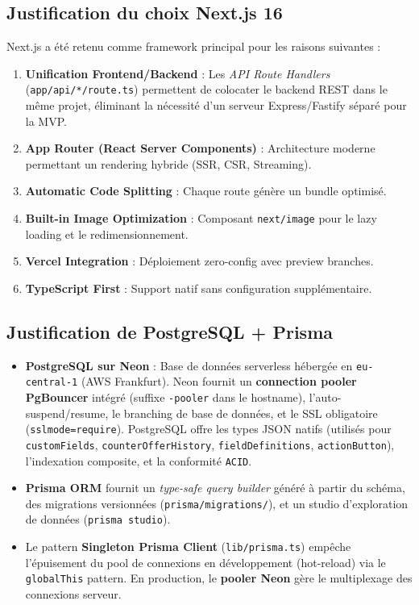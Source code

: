 \documentclass[12pt, a4paper]{article}
\begin{document}
\subsection{Justification du choix Next.js 16}

Next.js a été retenu comme framework principal pour les raisons suivantes :

\begin{enumerate}[leftmargin=2em]
  \item \textbf{Unification Frontend/Backend} : Les \textit{API Route Handlers} (\texttt{app/api/*/route.ts}) permettent de colocater le backend REST dans le même projet, éliminant la nécessité d'un serveur Express/Fastify séparé pour la MVP.
  \item \textbf{App Router (React Server Components)} : Architecture moderne permettant un rendering hybride (SSR, CSR, Streaming).
  \item \textbf{Automatic Code Splitting} : Chaque route génère un bundle optimisé.
  \item \textbf{Built-in Image Optimization} : Composant \texttt{next/image} pour le lazy loading et le redimensionnement.
  \item \textbf{Vercel Integration} : Déploiement zero-config avec preview branches.
  \item \textbf{TypeScript First} : Support natif sans configuration supplémentaire.
\end{enumerate}

\subsection{Justification de PostgreSQL + Prisma}

\begin{itemize}[leftmargin=2em]
  \item \textbf{PostgreSQL sur Neon} : Base de données serverless hébergée en \texttt{eu-central-1} (AWS Frankfurt). Neon fournit un \textbf{connection pooler PgBouncer} intégré (suffixe \texttt{-pooler} dans le hostname), l'auto-suspend/resume, le branching de base de données, et le SSL obligatoire (\texttt{sslmode=require}). PostgreSQL offre les types JSON natifs (utilisés pour \texttt{customFields}, \texttt{counterOfferHistory}, \texttt{fieldDefinitions}, \texttt{actionButton}), l'indexation composite, et la conformité \texttt{ACID}.
  \item \textbf{Prisma ORM} fournit un \textit{type-safe query builder} généré à partir du schéma, des migrations versionnées (\texttt{prisma/migrations/}), et un studio d'exploration de données (\texttt{prisma studio}).
  \item Le pattern \textbf{Singleton Prisma Client} (\texttt{lib/prisma.ts}) empêche l'épuisement du pool de connexions en développement (hot-reload) via le \texttt{globalThis} pattern. En production, le \textbf{pooler Neon} gère le multiplexage des connexions serveur.
\end{itemize}
\end{document}
